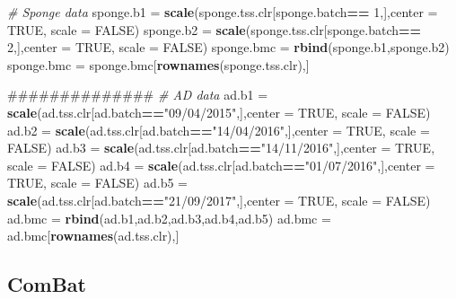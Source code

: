 \documentclass[]{book}
\newenvironment{Shaded}{\begin{snugshade}}{\end{snugshade}}
\newcommand{\KeywordTok}[1]{\textcolor[rgb]{0.13,0.29,0.53}{\textbf{#1}}}
\newcommand{\DataTypeTok}[1]{\textcolor[rgb]{0.13,0.29,0.53}{#1}}
\newcommand{\DecValTok}[1]{\textcolor[rgb]{0.00,0.00,0.81}{#1}}
\newcommand{\StringTok}[1]{\textcolor[rgb]{0.31,0.60,0.02}{#1}}
\newcommand{\CommentTok}[1]{\textcolor[rgb]{0.56,0.35,0.01}{\textit{#1}}}
\newcommand{\OtherTok}[1]{\textcolor[rgb]{0.56,0.35,0.01}{#1}}
\newcommand{\OperatorTok}[1]{\textcolor[rgb]{0.81,0.36,0.00}{\textbf{#1}}}
\newcommand{\NormalTok}[1]{#1}
\begin{document}
\begin{Shaded}
\begin{Highlighting}[]
\CommentTok{# Sponge data}
\NormalTok{sponge.b1 =}\StringTok{ }\KeywordTok{scale}\NormalTok{(sponge.tss.clr[sponge.batch}\OperatorTok{==}\StringTok{ }\DecValTok{1}\NormalTok{,],}\DataTypeTok{center =} \OtherTok{TRUE}\NormalTok{, }\DataTypeTok{scale =} \OtherTok{FALSE}\NormalTok{)}
\NormalTok{sponge.b2 =}\StringTok{ }\KeywordTok{scale}\NormalTok{(sponge.tss.clr[sponge.batch}\OperatorTok{==}\StringTok{ }\DecValTok{2}\NormalTok{,],}\DataTypeTok{center =} \OtherTok{TRUE}\NormalTok{, }\DataTypeTok{scale =} \OtherTok{FALSE}\NormalTok{)}
\NormalTok{sponge.bmc =}\StringTok{ }\KeywordTok{rbind}\NormalTok{(sponge.b1,sponge.b2)}
\NormalTok{sponge.bmc =}\StringTok{ }\NormalTok{sponge.bmc[}\KeywordTok{rownames}\NormalTok{(sponge.tss.clr),]}

\NormalTok{##############}
\CommentTok{# AD data}
\NormalTok{ad.b1 =}\StringTok{ }\KeywordTok{scale}\NormalTok{(ad.tss.clr[ad.batch}\OperatorTok{==}\StringTok{"09/04/2015"}\NormalTok{,],}\DataTypeTok{center =} \OtherTok{TRUE}\NormalTok{, }\DataTypeTok{scale =} \OtherTok{FALSE}\NormalTok{)}
\NormalTok{ad.b2 =}\StringTok{ }\KeywordTok{scale}\NormalTok{(ad.tss.clr[ad.batch}\OperatorTok{==}\StringTok{"14/04/2016"}\NormalTok{,],}\DataTypeTok{center =} \OtherTok{TRUE}\NormalTok{, }\DataTypeTok{scale =} \OtherTok{FALSE}\NormalTok{)}
\NormalTok{ad.b3 =}\StringTok{ }\KeywordTok{scale}\NormalTok{(ad.tss.clr[ad.batch}\OperatorTok{==}\StringTok{"14/11/2016"}\NormalTok{,],}\DataTypeTok{center =} \OtherTok{TRUE}\NormalTok{, }\DataTypeTok{scale =} \OtherTok{FALSE}\NormalTok{)}
\NormalTok{ad.b4 =}\StringTok{ }\KeywordTok{scale}\NormalTok{(ad.tss.clr[ad.batch}\OperatorTok{==}\StringTok{"01/07/2016"}\NormalTok{,],}\DataTypeTok{center =} \OtherTok{TRUE}\NormalTok{, }\DataTypeTok{scale =} \OtherTok{FALSE}\NormalTok{)}
\NormalTok{ad.b5 =}\StringTok{ }\KeywordTok{scale}\NormalTok{(ad.tss.clr[ad.batch}\OperatorTok{==}\StringTok{"21/09/2017"}\NormalTok{,],}\DataTypeTok{center =} \OtherTok{TRUE}\NormalTok{, }\DataTypeTok{scale =} \OtherTok{FALSE}\NormalTok{)}
\NormalTok{ad.bmc =}\StringTok{ }\KeywordTok{rbind}\NormalTok{(ad.b1,ad.b2,ad.b3,ad.b4,ad.b5)}
\NormalTok{ad.bmc =}\StringTok{ }\NormalTok{ad.bmc[}\KeywordTok{rownames}\NormalTok{(ad.tss.clr),]}
\end{Highlighting}
\end{Shaded}

\subsection{ComBat}\label{combat}
\end{document}
